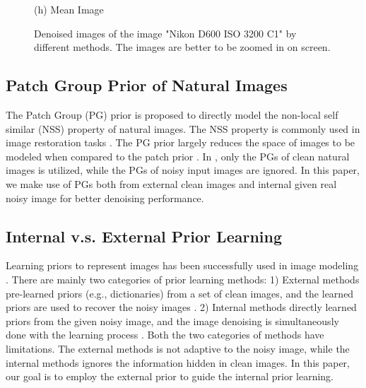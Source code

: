 \documentclass[10pt,twocolumn,letterpaper]{article}
\begin{document}
\begin{figure}
{\begin{minipage}[t]{0.195\textwidth}
{\footnotesize (h) Mean Image }
\end{minipage}
}
\caption{Denoised images of the image "Nikon D600 ISO 3200 C1" by different methods. The images are better to be zoomed in on screen.}\vspace{-4mm}
\end{figure}

\subsection{Patch Group Prior of Natural Images}

The Patch Group (PG) prior \cite{pgpd} is proposed to directly model the non-local self similar (NSS) property of natural images. The NSS property is commonly used in image restoration tasks \cite{nlm,bm3d,lssc,wnnm,pgpd}. The PG prior largely reduces the space of images to be modeled when compared to the patch prior \cite{epll}. In \cite{pgpd}, only the PGs of clean natural images is utilized, while the PGs of noisy input images are ignored. In this paper, we make use of PGs both from external clean images and internal given real noisy image for better denoising performance.


\subsection{Internal v.s. External Prior Learning}

Learning priors to represent images has been successfully used in image modeling \cite{ksvd,epll,pgpd,ple,ncsr}. There are mainly two categories of prior learning methods: 1) External methods pre-learned priors (e.g., dictionaries) from a set of clean images, and the learned priors are used to recover the noisy images \cite{epll,pgpd}. 2) Internal methods directly learned priors from the given noisy image, and the image denoising is simultaneously done with the learning process \cite{ksvd,ple,ncsr}. Both the two categories of methods have limitations. The external methods is not adaptive to the noisy image, while the internal methods ignores the information hidden in clean images. In this paper, our goal is to employ the external prior to guide the internal prior learning.
\end{document}
